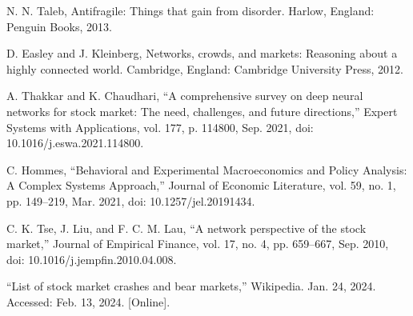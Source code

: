 \documentclass[letterpaper, 10 pt, proceedings]{ieeetran}  %
\begin{document}

\begin{thebibliography}{99}	
	N. N. Taleb, Antifragile: Things that gain from disorder. Harlow, England: Penguin Books, 2013.
	
	D. Easley and J. Kleinberg, Networks, crowds, and markets: Reasoning about a highly connected world. Cambridge, England: Cambridge University Press, 2012.

	A. Thakkar and K. Chaudhari, “A comprehensive survey on deep neural networks for stock market: The need, challenges, and future directions,” Expert Systems with Applications, vol. 177, p. 114800, Sep. 2021, doi: 10.1016/j.eswa.2021.114800.
	
	C. Hommes, “Behavioral and Experimental Macroeconomics and Policy Analysis: A Complex Systems Approach,” Journal of Economic Literature, vol. 59, no. 1, pp. 149–219, Mar. 2021, doi: 10.1257/jel.20191434.
	
	C. K. Tse, J. Liu, and F. C. M. Lau, “A network perspective of the stock market,” Journal of Empirical Finance, vol. 17, no. 4, pp. 659–667, Sep. 2010, doi: 10.1016/j.jempfin.2010.04.008.

	“List of stock market crashes and bear markets,” Wikipedia. Jan. 24, 2024. Accessed: Feb. 13, 2024. [Online].
	
\end{thebibliography}
\end{document}
